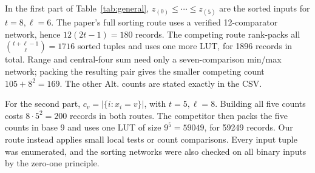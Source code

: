 \documentclass[10pt]{article}
\newcommand{\card}[1]{\lvert#1\rvert}
\begin{document}
In the first part of Table~\ref{tab:general},
\(z_{(0)}\le\cdots\le z_{(5)}\) are the sorted inputs for \(t=8,\ell=6\).
The paper's full sorting route uses a verified 12-comparator network, hence
\(12(2t-1)=180\) records.  The competing route rank-packs all
\(\binom{t+\ell-1}{\ell}=1716\) sorted tuples and uses one more LUT, for 1896
records in total.  Range and central-four sum need only a seven-comparison
min/max network; packing the resulting pair gives the smaller competing count
\(105+8^2=169\).  The other Alt. counts are stated exactly in the CSV.

For the second part, \(c_v=\card{\{i:x_i=v\}}\), with \(t=5,\ell=8\).
Building all five counts costs \(8\cdot5^2=200\) records in both routes.  The
competitor then packs the five counts in base 9 and uses one LUT of size
\(9^5=59049\), for 59249 records.  Our route instead applies small local tests
or count comparisons.  Every input tuple was enumerated, and the sorting
networks were also checked on all binary inputs by the zero-one principle.
\end{document}
